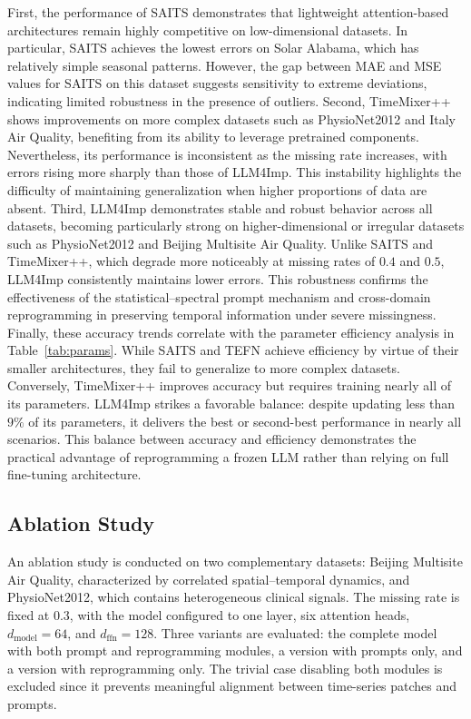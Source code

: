 \documentclass[conference]{IEEEtran}
\begin{document}
First, the performance of SAITS demonstrates that lightweight attention-based architectures remain highly competitive on low-dimensional datasets. In particular, SAITS achieves the lowest errors on Solar Alabama, which has relatively simple seasonal patterns. However, the gap between MAE and MSE values for SAITS on this dataset suggests sensitivity to extreme deviations, indicating limited robustness in the presence of outliers.
Second, TimeMixer++ shows improvements on more complex datasets such as PhysioNet2012 and Italy Air Quality, benefiting from its ability to leverage pretrained components. Nevertheless, its performance is inconsistent as the missing rate increases, with errors rising more sharply than those of LLM4Imp. This instability highlights the difficulty of maintaining generalization when higher proportions of data are absent.
Third, LLM4Imp demonstrates stable and robust behavior across all datasets, becoming particularly strong on higher-dimensional or irregular datasets such as PhysioNet2012 and Beijing Multisite Air Quality. Unlike SAITS and TimeMixer++, which degrade more noticeably at missing rates of $0.4$ and $0.5$, LLM4Imp consistently maintains lower errors. This robustness confirms the effectiveness of the statistical--spectral prompt mechanism and cross-domain reprogramming in preserving temporal information under severe missingness.
Finally, these accuracy trends correlate with the parameter efficiency analysis in Table~\ref{tab:params}. While SAITS and TEFN achieve efficiency by virtue of their smaller architectures, they fail to generalize to more complex datasets. Conversely, TimeMixer++ improves accuracy but requires training nearly all of its parameters. LLM4Imp strikes a favorable balance: despite updating less than $9\%$ of its parameters, it delivers the best or second-best performance in nearly all scenarios. This balance between accuracy and efficiency demonstrates the practical advantage of reprogramming a frozen LLM rather than relying on full fine-tuning architecture.

\subsection{Ablation Study}
An ablation study is conducted on two complementary datasets: Beijing Multisite Air Quality, characterized by correlated spatial--temporal dynamics, and PhysioNet2012, which contains heterogeneous clinical signals. The missing rate is fixed at $0.3$, with the model configured to one layer, six attention heads, $d_{\mathrm{model}}=64$, and $d_{\mathrm{ffn}}=128$. Three variants are evaluated: the complete model with both prompt and reprogramming modules, a version with prompts only, and a version with reprogramming only. The trivial case disabling both modules is excluded since it prevents meaningful alignment between time-series patches and prompts.
\end{document}
